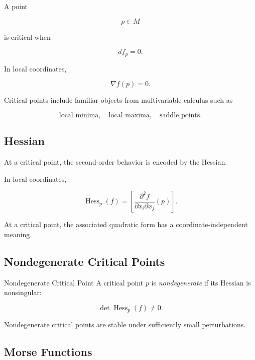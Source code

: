 A point

\[
p\in M
\]

is critical when

\[
\boxed{
df_p=0.
}
\]

In local coordinates,

\[
\boxed{
\nabla f(p)=0.
}
\]

Critical points include familiar objects from multivariable calculus such as

\[
\boxed{
\text{local minima},
\quad
\text{local maxima},
\quad
\text{saddle points}.
}
\]

\subsection{Hessian}
\label{subsec:morse-hessian}

At a critical point, the second-order behavior is encoded by the Hessian.

In local coordinates,

\[
\boxed{
\operatorname{Hess}_p(f)
=
\left[
\frac{\partial^2f}
{\partial x_i\partial x_j}(p)
\right].
}
\]

At a critical point, the associated quadratic form has a coordinate-independent
meaning.

\subsection{Nondegenerate Critical Points}
\label{subsec:nondegenerate-critical-points}

\begin{definitionbox}{Nondegenerate Critical Point}
A critical point \(p\) is \emph{nondegenerate} if its Hessian is
nonsingular:

\[
\boxed{
\det\operatorname{Hess}_p(f)\neq0.
}
\]
\end{definitionbox}

Nondegenerate critical points are stable under sufficiently small
perturbations.

\subsection{Morse Functions}
\label{subsec:morse-functions}

